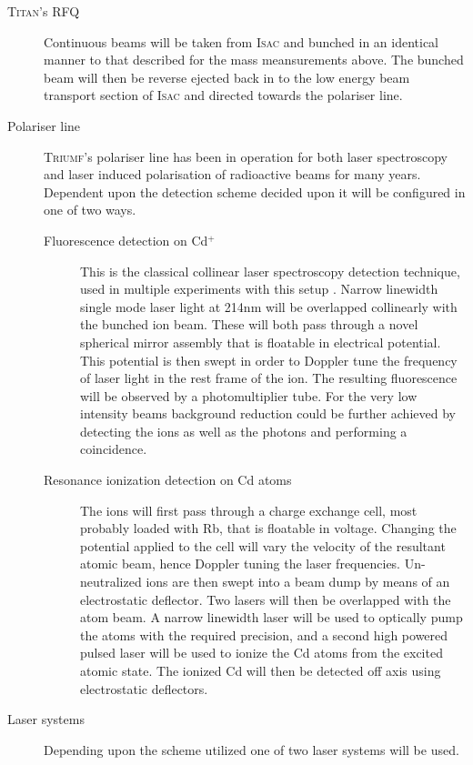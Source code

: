 \documentclass[12pt]{article}
\begin{document}
\begin{description}

\item [\textsc{Titan}'s RFQ]  Continuous beams will be taken from \textsc{Isac} and bunched in an identical manner to that described for the mass meansurements above. The bunched beam will then be reverse ejected back in to the low energy beam transport section of \textsc{Isac} and directed towards the polariser line.

\item [Polariser line] \textsc{Triumf}'s polariser line has been in operation for both laser spectroscopy and laser induced polarisation of radioactive beams for many years. Dependent upon the detection scheme decided upon it will be configured in one of two ways.

\begin{description}
\item [Fluorescence detection on Cd$^+$]  This is the classical collinear laser spectroscopy detection technique, used in multiple experiments with this setup \cite{Voss2016}. Narrow linewidth single mode laser light at 214nm will be overlapped collinearly with the bunched ion beam. These will both pass through a novel spherical  mirror assembly that is floatable in electrical potential. This potential is then swept in order to Doppler tune the frequency of laser light in the rest frame of the ion. The resulting fluorescence will be observed by a photomultiplier tube. For the very low intensity beams background reduction could be further achieved by detecting the ions as well as the photons and performing a coincidence.

\item [Resonance ionization detection on Cd atoms]  The ions will first pass through a charge exchange cell, most probably loaded with Rb, that is floatable in voltage. Changing the potential applied to the cell will vary the velocity of the resultant atomic beam, hence Doppler tuning the laser frequencies. Un-neutralized ions are then swept into a beam dump by means of an electrostatic deflector. Two lasers will then be overlapped with the atom beam. A narrow linewidth laser will be used to optically pump the atoms with the required precision, and a second high powered pulsed laser will be used to ionize the Cd atoms from the excited atomic state. The ionized Cd will then be detected off axis using electrostatic deflectors.

\end{description}
\item [Laser systems] Depending upon the scheme utilized one of two laser systems will be used.


\end{description}
\end{document}
